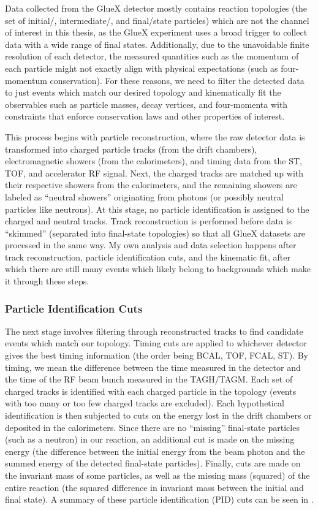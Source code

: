 Data collected from the GlueX detector mostly contains reaction topologies (the set of initial\-/, intermediate\-/, and final\-/state particles) which are not the channel of interest in this thesis, as the GlueX experiment uses a broad trigger to collect data with a wide range of final states. Additionally, due to the unavoidable finite resolution of each detector, the measured quantities such as the momentum of each particle might not exactly align with physical expectations (such as four-momentum conservation). For these reasons, we need to filter the detected data to just events which match our desired topology and kinematically fit the observables such as particle masses, decay vertices, and four-momenta with constraints that enforce conservation laws and other properties of interest.

This process begins with particle reconstruction, where the raw detector data is transformed into charged particle tracks (from the drift chambers), electromagnetic showers (from the calorimeters), and timing data from the ST, TOF, and accelerator RF signal. Next, the charged tracks are matched up with their respective showers from the calorimeters, and the remaining showers are labeled as ``neutral showers'' originating from photons (or possibly neutral particles like neutrons). At this stage, no particle identification is assigned to the charged and neutral tracks. Track reconstruction is performed before data is ``skimmed'' (separated into final-state topologies) so that all GlueX datasets are processed in the same way. My own analysis and data selection happens after track reconstruction, particle identification cuts, and the kinematic fit, after which there are still many events which likely belong to backgrounds which make it through these steps.

\subsubsection{Particle Identification Cuts}

The next stage involves filtering through reconstructed tracks to find candidate events which match our topology. Timing cuts are applied to whichever detector gives the best timing information (the order being BCAL, TOF, FCAL, ST). By timing, we mean the difference between the time measured in the detector and the time of the RF beam bunch measured in the TAGH/TAGM. Each set of charged tracks is identified with each charged particle in the topology (events with too many or too few charged tracks are excluded). Each hypothetical identification is then subjected to cuts on the energy lost in the drift chambers or deposited in the calorimeters. Since there are no ``missing'' final-state particles (such as a neutron) in our reaction, an additional cut is made on the missing energy (the difference between the initial energy from the beam photon and the summed energy of the detected final-state particles). Finally, cuts are made on the invariant mass of some particles, as well as the missing mass (squared) of the entire reaction (the squared difference in invariant mass between the initial and final state). A summary of these particle identification (PID) cuts can be seen in .

